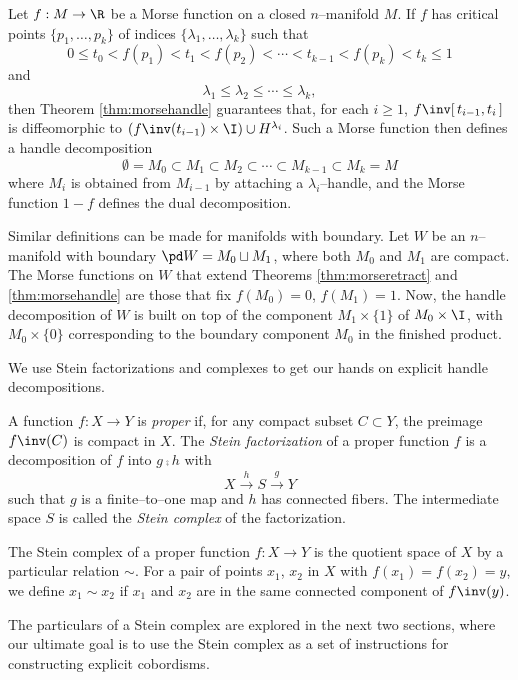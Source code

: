 Let $f:M\to\R$ be a Morse function on a closed $n$--manifold $M$.
If $f$ has critical points $\{p_1,\dots,p_k\}$ of indices $\{\lambda_1,\dots,\lambda_k\}$ such that
\[
	0\leq t_0 < f(p_1) < t_1 < f(p_2) < \cdots < t_{k-1} < f(p_k) < t_k \leq 1
\]
and
\[
	\lambda_1 \leq \lambda_2 \leq \cdots \leq \lambda_k,
\]
then Theorem \ref{thm:morsehandle} guarantees that, for each $i\geq 1$, $f\inv[\,t_{i-1},t_i\,]$ is diffeomorphic to $(f\inv(t_{i-1})\times\I)\cup H^{\lambda_i}$.
Such a Morse function then defines a handle decomposition
\[
	\emptyset = M_0 \subset M_1 \subset M_2 \subset \cdots \subset M_{k-1} \subset M_k = M
\]
where $M_i$ is obtained from $M_{i-1}$ by attaching a $\lambda_i$--handle, and the Morse function $1-f$ defines the dual decomposition.

Similar definitions can be made for manifolds with boundary.
Let $W$ be an $n$--manifold with boundary $\pd W = M_0\sqcup M_1$, where both $M_0$ and $M_1$ are compact.
The Morse functions on $W$ that extend Theorems \ref{thm:morseretract} and \ref{thm:morsehandle} are those that fix $f(M_0)=0$, $f(M_1)=1$.
Now, the handle decomposition of $W$ is built on top of the component $M_1\times\{1\}$ of $M_0\times\I$, with $M_0\times\{0\}$ corresponding to the boundary component $M_0$ in the finished product.

We use Stein factorizations and complexes to get our hands on explicit handle decompositions.

\begin{defn}
	\label{def:stein}
	A function $f:X\to Y$ is \emph{proper} if, for any compact subset $C\subset Y$, the preimage $f\inv(C)$ is compact in $X$.
	The \emph{Stein factorization} of a proper function $f$ is a decomposition of $f$ into $g\comp h$ with $$X\overset{h}{\to} S \overset{g}{\to} Y$$ such that $g$ is a finite--to--one map and $h$ has connected fibers.
	The intermediate space $S$ is called the \emph{Stein complex} of the factorization.
\end{defn}

The Stein complex of a proper function $f:X\to Y$ is the quotient space of $X$ by a particular relation $\sim$.
For a pair of points $x_1$, $x_2$ in $X$ with $f(x_1)=f(x_2)=y$, we define $x_1\sim x_2$ if $x_1$ and $x_2$ are in the same connected component of $f\inv(y)$.

The particulars of a Stein complex are explored in the next two sections, where our ultimate goal is to use the Stein complex as a set of instructions for constructing explicit cobordisms.
